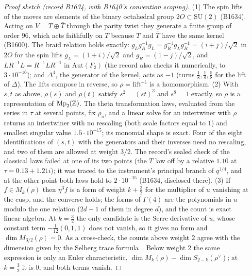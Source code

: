\begin{proof}[Proof sketch (record B1634, with B1640's convention scoping)]
(1) The spin lifts of the moves are elements of the binary octahedral group $2O\subset\mathrm{SU}(2)$ (B1634). Acting on
$V=T\oplus\bar T$ through the parity twist they generate a finite group of order $96$, which acts faithfully on $T$
because $T$ and $\bar T$ have the same kernel (B1600). The braid relation holds exactly: $g_Lg_R^{-1}g_L=g_R^{-1}g_Lg_R^{-1}=(i+j)/\sqrt2$ in $2O$ for the spin lifts
$g_L=(1+i)/\sqrt2$ and $g_R=(1-j)/\sqrt2$, and $LR^{-1}L=R^{-1}LR^{-1}$ in $\mathrm{Aut}(F_2)$ (the record also checks it
numerically, to $3\cdot10^{-16}$); and $\Delta^4$, the generator of the kernel, acts as $-1$ (turns $\tfrac18,\tfrac18,\tfrac58$ for the
lift of $\Delta$). The lifts compose in reverse, so $\rho=\mathrm{lift}^{-1}$ is a homomorphism. (2) With $s,t$ as above,
$\rho(s)$ and $\rho(t)$ satisfy $s^2=(st)^3$ and $s^8=1$ exactly, so $\rho$ is a representation of $\mathrm{Mp}_2(\mathbb{Z})$. The
theta transformation laws, evaluated from the series in $\tau$ at several points, fix $\rho_u$, and a linear solve for an
intertwiner with $\rho$ returns an intertwiner with no rescaling (both scale factors equal to $1$) and smallest singular value $1.5\cdot10^{-15}$; its monomial shape is
exact. Four of the eight identifications of $(s,t)$ with the generators and their inverses need no rescaling, and two of
them are allowed at weight $3/2$. The record's sealed check of the classical laws failed at one of its two points (the
$T$ law off by a relative $1.10$ at $\tau=0.13+1.21i$); it was traced to the instrument's principal branch of $q^{1/4}$,
and at the other point both laws hold to $2\cdot10^{-15}$ (B1634, disclosed there). (3) If $f\in M_k(\rho)$ then $\eta^3f$ is a form of weight $k+\tfrac32$ for the
multiplier of $u$ vanishing at the cusp, and the converse holds; the forms of $\Gamma(4)$ are the polynomials in $u$
modulo the one relation ($2d+1$ of them in degree $d$), and the count is exact linear algebra. At $k=\tfrac32$ the only
candidate is the Serre derivative of $u$, whose constant term $-\tfrac1{12}(0,1,1)$ does not vanish, so it gives no form
and $\dim M_{3/2}(\rho)=0$. As a cross-check, the counts above weight $2$ agree with the dimension given by the
Selberg trace formula~\cite[\S7]{Borcherds2000}. Below weight $2$ the same expression is only an Euler characteristic,
$\dim M_k(\rho)-\dim S_{2-k}(\rho^\vee)$; at $k=\tfrac32$ it is $0$, and both terms vanish.
\end{proof}

